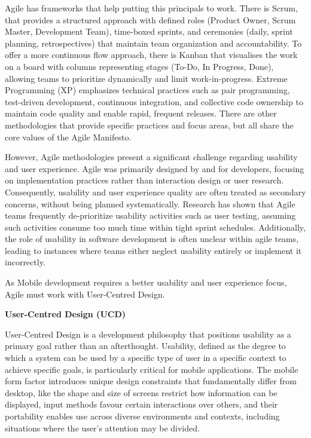 Agile has frameworks that help putting this principals to work.  There is Scrum, that provides a structured approach with defined roles (Product Owner, Scrum Master, Development Team), time-boxed sprints, and ceremonies (daily, sprint planning, retrospectives) that maintain team organization and accountability. To offer a more continuous flow approach, there is Kanban that visualises the work on a board with columns representing stages (To-Do, In Progress, Done), allowing teams to prioritize dynamically and limit work-in-progress. Extreme Programming (XP) emphasizes technical practices such as pair programming, test-driven development, continuous integration, and collective code ownership to maintain code quality and enable rapid, frequent releases. There are other methodologies that provide specific practices and focus areas, but all share the core values of the Agile Manifesto. \cite{agile-manifesto} 

However, Agile methodologies present a significant challenge regarding usability and user experience. Agile was primarily designed by and for developers, focusing on implementation practices rather than interaction design or user research. Consequently, usability and user experience quality are often treated as secondary concerns, without being planned systematically. Research has shown that Agile teams frequently de-prioritize usability activities such as user testing, assuming such activities consume too much time within tight sprint schedules. Additionally, the role of usability in software development is often unclear within agile teams, leading to instances where teams either neglect usability entirely or implement it incorrectly.\cite{10795519}

As Mobile development requires a better usability and user experience focus, Agile must work with User-Centred Design.

\textbf{User-Centred Design (UCD)}\label{subsec:ucd}

User-Centred Design is a development philosophy that positions usability as a primary goal rather than an afterthought. Usability, defined as the degree to which a system can be used by a specific type of user in a specific context to achieve specific goals, is particularly critical for mobile applications. The mobile form factor introduces unique design constraints that fundamentally differ from desktop, like the shape and size of screens restrict how information can be displayed, input methods favour certain interactions over others, and their portability enables use across diverse environments and contexts, including situations where the user's attention may be divided.\cite{10795519}

